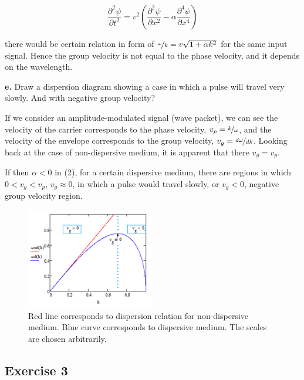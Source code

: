 \documentclass[11pt,a4paper]{article}
\begin{document}
\begin{equation}
    \frac{\partial^2{\psi}}{\partial{t^2}}=v^2(\frac{\partial^2{\psi}}{\partial{x^2}}-\alpha\frac{\partial^4\psi}{\partial{x^4}})
\end{equation}

there would be certain relation in form of $\nicefrac{\omega}{k}=v\sqrt{1+\alpha{k^2}}$ for the same input signal. Hence the group velocity is not equal to the phase velocity, and it depends on the wavelength. 

\begin{displayquote}
    \textbf{e.} Draw a dispersion diagram showing a case in which a pulse will travel very slowly. And with negative group velocity?
\end{displayquote}

If we consider an amplitude-modulated signal (wave packet), we can see the velocity of the carrier corresponds to the phase velocity, $v_p=\nicefrac{k}{\omega}$, and the velocity of the envelope corresponds to the group velocity, $v_g=\nicefrac{d\omega}{dk}$. Looking back at the case of non-dispersive medium, it is apparent that there $v_g=v_p$. 

If then $\alpha<0$ in (2), for a certain dispersive medium, there are regions in which $0<v_g<v_p$,  $v_g\approx{}0$, in which a pulse would travel slowly, or $v_g<0$, negative group velocity region. 

\begin{figure}[ht]
    \centering
    \includegraphics[width=0.5\textwidth]{ex1.png}
    \caption{Red line corresponds to dispersion relation for non-dispersive medium. Blue curve corresponds to dispersive medium. The scales are chosen arbitrarily.}
    \label{fig:my_label}
\end{figure}

\subsection*{Exercise 3}
\end{document}
